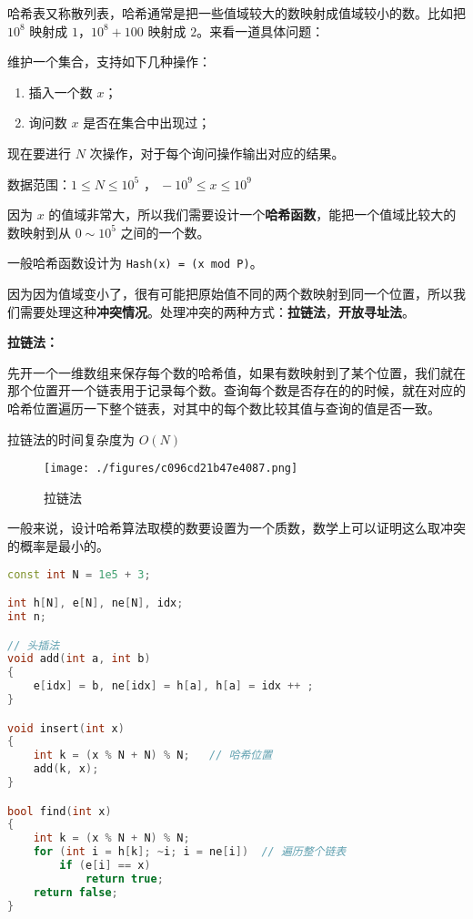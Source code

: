 
哈希表又称散列表，哈希通常是把一些值域较大的数映射成值域较小的数。比如把 $10^8$ 映射成 $1$，$10^8 + 100$ 映射成 $2$。来看一道具体问题：

维护一个集合，支持如下几种操作：

\begin{enumerate}
\item 插入一个数 $x$；

\item 询问数 $x$ 是否在集合中出现过；

\end{enumerate}
现在要进行 $N$ 次操作，对于每个询问操作输出对应的结果。

数据范围：$ 1 \le N \le 10^5$ ，$\ -10^9 \le x \le 10^9$

因为 $x$ 的值域非常大，所以我们需要设计一个\textbf{哈希函数}，能把一个值域比较大的数映射到从 $0 \sim 10^5$ 之间的一个数。

一般哈希函数设计为 \verb|Hash(x) = (x mod P)|。

因为因为值域变小了，很有可能把原始值不同的两个数映射到同一个位置，所以我们需要处理这种\textbf{冲突情况}。处理冲突的两种方式：\textbf{拉链法}，\textbf{开放寻址法}。

\textbf{拉链法：}

先开一个一维数组来保存每个数的哈希值，如果有数映射到了某个位置，我们就在那个位置开一个链表用于记录每个数。查询每个数是否存在的的时候，就在对应的哈希位置遍历一下整个链表，对其中的每个数比较其值与查询的值是否一致。

拉链法的时间复杂度为 $O(N)$
\begin{figure}[ht]
\centering
\texttt{[image: ./figures/c096cd21b47e4087.png]}
\caption{拉链法} \label{fig_hash_1}
\end{figure}

一般来说，设计哈希算法取模的数要设置为一个质数，数学上可以证明这么取冲突的概率是最小的。
\begin{lstlisting}[language=cpp]
const int N = 1e5 + 3;

int h[N], e[N], ne[N], idx;
int n;

// 头插法
void add(int a, int b)
{
    e[idx] = b, ne[idx] = h[a], h[a] = idx ++ ;
}

void insert(int x)
{
    int k = (x % N + N) % N;   // 哈希位置
    add(k, x);
}

bool find(int x)
{
    int k = (x % N + N) % N;
    for (int i = h[k]; ~i; i = ne[i])  // 遍历整个链表
        if (e[i] == x)
            return true;
    return false;
}
\end{lstlisting}

